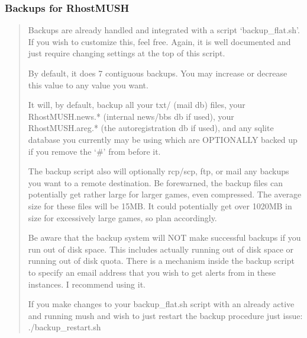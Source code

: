 \documentclass[letterpaper,10pt,english]{sphinxmanual}
\begin{document}
\subsubsection{Backups for RhostMUSH}
\label{\detokenize{installation:backups-for-rhostmush}}\begin{quote}

\sphinxAtStartPar
Backups are already handled and integrated with a script ‘backup\_flat.sh’.
If you wish to customize this, feel free.  Again, it is well documented and
just require changing settings at the top of this script.

\sphinxAtStartPar
By default, it does 7 contiguous backups.  You may increase or decrease
this value to any value you want.

\sphinxAtStartPar
It will, by default, backup all your txt/
(mail db) files, your RhostMUSH.news.* (internal news/bbs db \textendash{} if used),
your RhostMUSH.areg.* (the autoregistration db \textendash{} if used), and any sqlite
database you currently may be using which are OPTIONALLY backed up if you
remove the ‘\#’ from before it.

\sphinxAtStartPar
The backup script also will optionally rcp/scp, ftp, or mail any backups
you want to a remote destination.  Be forewarned, the backup files can
potentially get rather large for larger games, even compressed.  The
average size for these files will be 1\sphinxhyphen{}5MB.  It could potentially get
over 10\sphinxhyphen{}20MB in size for excessively large games, so plan accordingly.

\sphinxAtStartPar
Be aware that the backup system will NOT make successful backups if you
run out of disk space.  This includes actually running out of disk space
or running out of disk quota.  There is a mechanism inside the backup
script to specify an email address that you wish to get alerts from
in these instances.  I recommend using it.

\sphinxAtStartPar
If you make changes to your backup\_flat.sh script with an already
active and running mush and wish to just restart the backup procedure
just issue: ./backup\_restart.sh
\end{quote}
\end{document}

